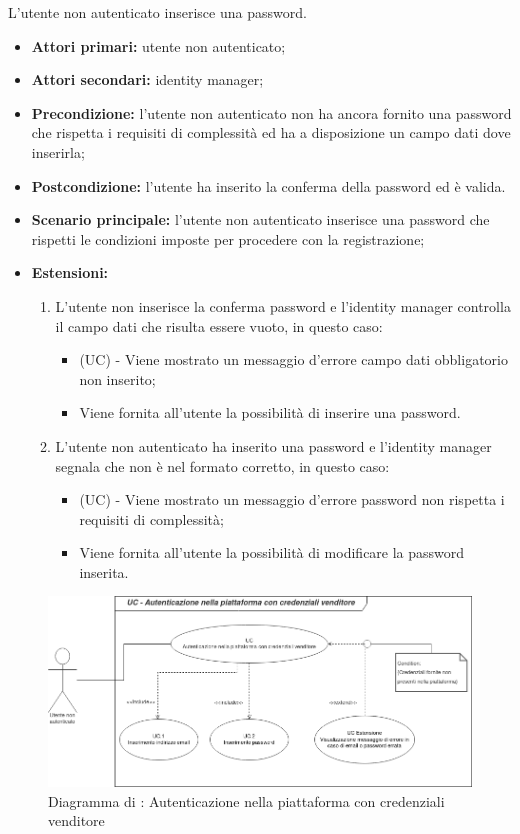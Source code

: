 L'utente non autenticato inserisce una password.
\begin{itemize}
	\item \textbf{Attori primari:} utente non autenticato;
	\item \textbf{Attori secondari:} identity manager;
	\item \textbf{Precondizione:} l'utente non autenticato non ha ancora fornito una password che rispetta i requisiti di complessità ed ha a disposizione un campo dati dove inserirla;
	\item \textbf{Postcondizione:} l'utente ha inserito la conferma della password ed è valida.
	\item \textbf{Scenario principale:} l'utente non autenticato inserisce una password che rispetti le condizioni imposte per procedere con la registrazione;
	\item \textbf{Estensioni:} 
	\begin{enumerate}[label=\lett]
		\item L'utente non inserisce la conferma password e l'identity manager controlla il campo dati che risulta essere vuoto, in questo caso:
		\begin{itemize}
			\item (UC) - Viene mostrato un messaggio d'errore campo dati obbligatorio non inserito;
			\item Viene fornita all'utente la possibilità di inserire una password.
		\end{itemize}
		\item L'utente non autenticato ha inserito una password e l'identity manager segnala che non è nel formato corretto, in questo caso:
		\begin{itemize}
			\item (UC) - Viene mostrato un messaggio d'errore password non rispetta i requisiti di complessità;
			\item Viene fornita all'utente la possibilità di modificare la password inserita.
		\end{itemize}
	\end{enumerate} 
\end{itemize}

\begin{figure}[H]
    \centering
    \includegraphics[scale=0.6]{Immagini/DiagrammiUC/AccessoVenditore.png}
    \caption{Diagramma di \actualUC: Autenticazione nella piattaforma con credenziali venditore} 
    \label{fig:LoginVenditore}
\end{figure}

